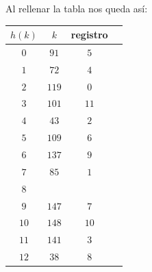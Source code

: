 \documentclass[10pt,a4paper,spanish]{report}
\begin{document}
\newpage
\noindent
Al rellenar la tabla nos queda así:

\begin{minipage}{0.5\textwidth}
\begin{tabular}{c | c | c | c}
$h(k)$ & $k$ & registro \\
\hline
$0$ & $91$ & $5$ \\
$1$ & $72$ & $4$ \\
$2$ & $119$ & $0$ \\
$3$ &  $101$ & $11$ \\
$4$ & $43$ & $2$ \\
$5$ & $109$ & $6$ \\
$6$ & $137$ & $9$ \\
$7$ & $85$ & $1$ \\
$8$ & & \\
$9$ & $147$ & $7$ \\
$10$ & $148$ & $10$ \\
$11$ & $141$ & $3$ \\
$12$ & $38$ & $8$ \\
\end{tabular}
\end{minipage}
\end{document}
